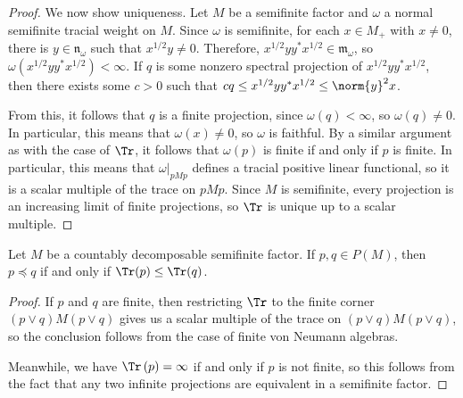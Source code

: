 \documentclass[10pt]{mypackage}
\begin{document}
\begin{proof}
  We now show uniqueness. Let $M$ be a semifinite factor and $\omega$ a normal semifinite tracial weight on $M$. Since $\omega$ is semifinite, for each $x\in M_{+}$ with $x\neq 0$, there is $y\in \mathfrak{n}_{\omega}$ such that $x^{1/2}y\neq 0$. Therefore, $x^{1/2}yy^{\ast}x^{1/2}\in \mathfrak{m}_{\omega}$, so $\omega\left( x^{1/2}yy^{\ast}x^{1/2} \right) < \infty$. If $q$ is some nonzero spectral projection of $x^{1/2}yy^{\ast}x^{1/2}$, then there exists some $c > 0$ such that $cq \leq x^{1/2}yy^{\ast}x^{1/2}\leq \norm{y}^2x$.

  From this, it follows that $q$ is a finite projection, since $\omega(q) < \infty$, so $\omega(q)\neq 0$. In particular, this means that $\omega(x)\neq 0$, so $\omega$ is faithful. By a similar argument as with the case of $\Tr$, it follows that $\omega(p)$ is finite if and only if $p$ is finite. In particular, this means that $\omega|_{pMp}$ defines a tracial positive linear functional, so it is a scalar multiple of the trace on $pMp$. Since $M$ is semifinite, every projection is an increasing limit of finite projections, so $\Tr$ is unique up to a scalar multiple.
\end{proof}
\begin{proposition}
  Let $M$ be a countably decomposable semifinite factor. If $p,q\in P(M)$, then $p\preceq q$ if and only if $\Tr(p)\leq \Tr(q)$.
\end{proposition}
\begin{proof}
  If $p$ and $q$ are finite, then restricting $\Tr$ to the finite corner $\left( p\vee q \right)M\left( p\vee q \right)$ gives us a scalar multiple of the trace on $\left( p\vee q \right)M\left( p\vee q \right)$, so the conclusion follows from the case of finite von Neumann algebras.

  Meanwhile, we have $\Tr\left( p \right) = \infty$ if and only if $p$ is not finite, so this follows from the fact that any two infinite projections are equivalent in a semifinite factor.
\end{proof}
\nocite{davidson_functional_analysis,conway_operator_theory,takesaki_1,ii1_factors_houdayer,ii1_factors_anantharaman_popa,goals_vna,von_neumann_algebras_peterson}
\printbibliography
\end{document}
